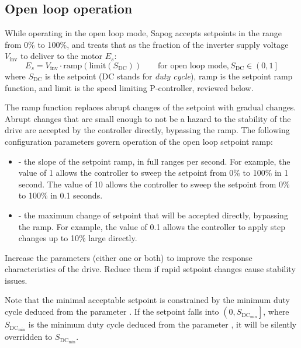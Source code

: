\documentclass{zubaxdoc}
\begin{document}
\subsection{Open loop operation}\label{sec:open_loop}

While operating in the open loop mode, Sapog accepts setpoints in the range from 0\% to 100\%,
and treats that as the fraction of the inverter supply voltage $V_\text{inv}$ to
deliver to the motor $E_s$:
\begin{equation}
	E_s = V_\text{inv}\cdot{}\mathrm{ramp}\left(\mathrm{limit}\left(S_\text{DC}\right)\right)
	\qquad\text{for open loop mode}, S_\text{DC} \in \left(0, 1\right]
\end{equation}
where $S_\text{DC}$ is the setpoint (DC stands for \emph{duty cycle}),
$\mathrm{ramp}$ is the setpoint ramp function,
and $\mathrm{limit}$ is the speed limiting P-controller, reviewed below.

The ramp function replaces abrupt changes of the setpoint with gradual changes.
Abrupt changes that are small enough to not be a hazard to the stability of the drive are
accepted by the controller directly, bypassing the ramp.
The following configuration parameters govern operation of the open loop setpoint ramp:

\begin{itemize}
	\item {} - the slope of the setpoint ramp, in full ranges per second.
	For example, the value of 1 allows the controller to sweep the setpoint from 0\% to 100\% in 1 second.
	The value of 10 allows the controller to sweep the setpoint from 0\% to 100\% in 0.1 seconds.
	\item {} - the maximum change of setpoint that will be accepted directly,
	bypassing the ramp.
	For example, the value of 0.1 allows the controller to apply step changes up to 10\% large directly.
\end{itemize}

Increase the parameters (either one or both) to improve the response characteristics of the drive.
Reduce them if rapid setpoint changes cause stability issues.

Note that the minimal acceptable setpoint is constrained by the minimum duty cycle deduced from
the parameter .
If the setpoint falls into $\left(0, S_{\text{DC}_\text{min}}\right]$,
where $S_{\text{DC}_\text{min}}$ is the minimum
duty cycle deduced from the parameter ,
it will be silently overridden to $S_{\text{DC}_\text{min}}$.
\end{document}
